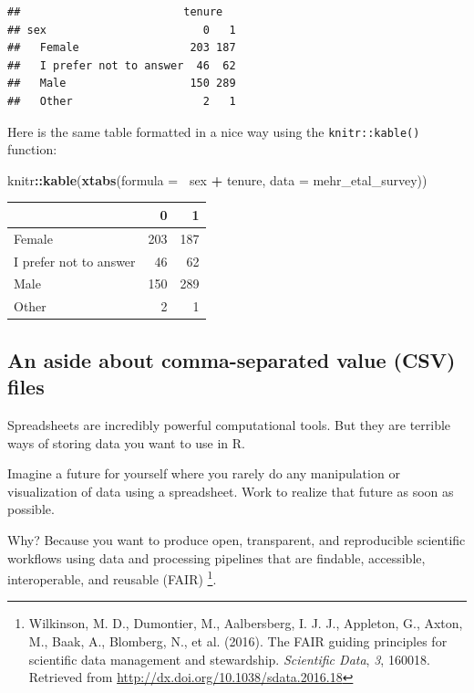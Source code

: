 \documentclass[]{article}
\newenvironment{Shaded}{\begin{snugshade}}{\end{snugshade}}
\newcommand{\KeywordTok}[1]{\textcolor[rgb]{0.13,0.29,0.53}{\textbf{#1}}}
\newcommand{\DataTypeTok}[1]{\textcolor[rgb]{0.13,0.29,0.53}{#1}}
\newcommand{\StringTok}[1]{\textcolor[rgb]{0.31,0.60,0.02}{#1}}
\newcommand{\OperatorTok}[1]{\textcolor[rgb]{0.81,0.36,0.00}{\textbf{#1}}}
\newcommand{\NormalTok}[1]{#1}
\let\rmarkdownfootnote\footnote%
\def\footnote{\protect\rmarkdownfootnote}
\begin{document}
\begin{verbatim}
##                         tenure
## sex                        0   1
##   Female                 203 187
##   I prefer not to answer  46  62
##   Male                   150 289
##   Other                    2   1
\end{verbatim}

Here is the same table formatted in a nice way using the
\texttt{knitr::kable()} function:

\begin{Shaded}
\begin{Highlighting}[]
\NormalTok{knitr}\OperatorTok{::}\KeywordTok{kable}\NormalTok{(}\KeywordTok{xtabs}\NormalTok{(}\DataTypeTok{formula =} \OperatorTok{~}\NormalTok{sex }\OperatorTok{+}\StringTok{ }\NormalTok{tenure, }\DataTypeTok{data =}\NormalTok{ mehr_etal_survey))}
\end{Highlighting}
\end{Shaded}

\begin{longtable}[]{@{}lrr@{}}
\toprule
& 0 & 1\tabularnewline
\midrule
\endhead
Female & 203 & 187\tabularnewline
I prefer not to answer & 46 & 62\tabularnewline
Male & 150 & 289\tabularnewline
Other & 2 & 1\tabularnewline
\bottomrule
\end{longtable}

\subsection{An aside about comma-separated value (CSV)
files}\label{an-aside-about-comma-separated-value-csv-files}

Spreadsheets are incredibly powerful computational tools. But they are
terrible ways of storing data you want to use in R.

Imagine a future for yourself where you rarely do any manipulation or
visualization of data using a spreadsheet. Work to realize that future
as soon as possible.

Why? Because you want to produce open, transparent, and reproducible
scientific workflows using data and processing pipelines that are
findable, accessible, interoperable, and reusable (FAIR) \footnote{Wilkinson,
  M. D., Dumontier, M., Aalbersberg, I. J. J., Appleton, G., Axton, M.,
  Baak, A., Blomberg, N., et al. (2016). The FAIR guiding principles for
  scientific data management and stewardship. \emph{Scientific Data},
  \emph{3}, 160018. Retrieved from
  \url{http://dx.doi.org/10.1038/sdata.2016.18}}.
\end{document}

